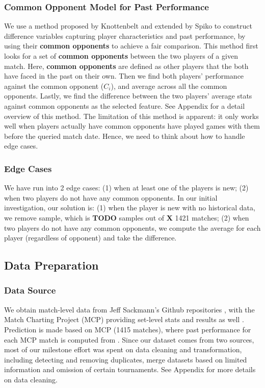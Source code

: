 \documentclass[paper=a4, fontsize=11pt]{scrartcl} %
\numberwithin{equation}{section} %
\numberwithin{figure}{section} %
\numberwithin{table}{section} %
\begin{document}
\subsubsection{Common Opponent Model for Past Performance}
We use a method proposed by Knottenbelt \cite{KNOTTENBELT20123820} and extended by Spiko \cite{tennis1} to construct difference variables capturing player characteristics and past performance, by using their \textbf{common opponents} to achieve a fair comparison. 
This method first looks for a set of \textbf{common opponents} between the two players of a given match. Here, \textbf{common opponents} are defined as other players that the both have faced in the past on their own. Then we find both players' performance against the common opponent ($C_i$), and average across all the common opponents. Lastly, we find the difference between the two players' average stats against common opponents as the selected feature.  See Appendix for a detail overview of this method.
The limitation of this method is apparent: it only works well when players actually have common opponents have played games with them before the queried match date. Hence, we need to think about how to handle edge cases.
\subsubsection{Edge Cases}
We have run into 2 edge cases: (1) when at least one of the players is new; (2) when two players do not have any common opponents.  In our initial investigation, our solution is: (1) when the player is new with no historical data, we remove sample, which is \textbf{TODO} samples out of \textbf{X} 1421 matches; (2) when two players do not have any common opponents, we compute the average for each player (regardless of opponent) and take the difference.
\subsection{Data Preparation}
\subsubsection{Data Source}
We obtain match-level data from Jeff Sackmann's Github repositories \cite{tennis_atp} \cite{tennis_charting}, with the Match Charting Project (MCP) providing set-level stats and results as well \cite{tennis_charting}. Prediction is made based on MCP (1415 matches), where past performance for each MCP match is computed from \cite{tennis_atp}. Since our dataset comes from two sources, most of our milestone effort was spent on data cleaning and transformation, including detecting and removing duplicates, merge datasets based on limited information and omission of certain tournaments.  See Appendix for more details on data cleaning.
\end{document}
